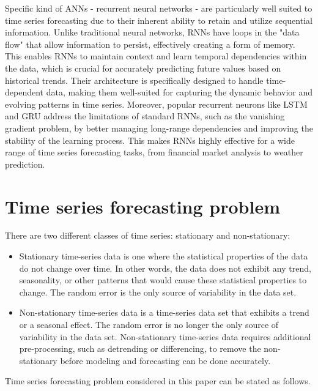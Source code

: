 \documentclass[sn-apa]{sn-jnl}%
\begin{document}
Specific kind of ANNs - recurrent neural networks - are particularly well suited to time series forecasting due to their inherent ability to retain and utilize sequential information. Unlike traditional neural networks, RNNs have loops in the "data flow" that allow information to persist, effectively creating a form of memory. This enables RNNs to maintain context and learn temporal dependencies within the data, which is crucial for accurately predicting future values based on historical trends. Their architecture is specifically designed to handle time-dependent data, making them well-suited for capturing the dynamic behavior and evolving patterns in time series. Moreover, popular recurrent neurons like LSTM and GRU address the limitations of standard RNNs, such as the vanishing gradient problem, by better managing long-range dependencies and improving the stability of the learning process. This makes RNNs highly effective for a wide range of time series forecasting tasks, from financial market analysis to weather prediction.

\section{Time series forecasting problem}\label{sec3}
There are two different classes of time series: stationary and non-stationary:

\begin{itemize}
\item Stationary time-series data is one where the statistical properties of the data do not change over time. In other words, the data does not exhibit any trend, seasonality, or other patterns that would cause these statistical properties to change. The random error is the only source of variability in the data set.
\item Non-stationary time-series data is a time-series data set that exhibits a trend or a seasonal effect. The random error is no longer the only source of variability in the data set. Non-stationary time-series data requires additional pre-processing, such as detrending or differencing, to remove the non-stationary before modeling and forecasting can be done accurately. 
\end{itemize}

Time series forecasting problem considered in this paper can be stated as follows.
\end{document}
